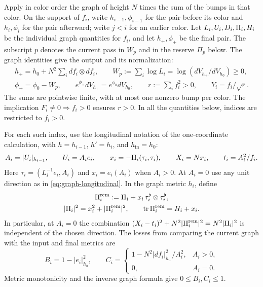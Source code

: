 Apply in color order the graph of height \(N\) times the sum of the
bumps in that color.  On the support of \(f_i\), write
\(h_{i-1},\phi_{i-1}\) for the pair before its color and
\(h_i,\phi_i\) for the pair afterward; write \(j<i\) for an earlier
color.  Let \(L_i,U_i,D_i,\mathrm{II}_i,H_i\) be the individual graph
quantities for \(f_i\), and let \(h_+,\phi_+\) be the final pair.
The subscript \(p\) denotes the current pass in \(W_p\) and in the
reserve \(\Pi_p\) below.
The graph identities give the output and its normalization:
\begin{equation}
 \begin{gathered}
 h_+=h_0+N^2\sum_i df_i\otimes df_i,\qquad
 W_p:=\sum_i\log L_i=\log(dV_{h_+}/dV_{h_0})\ge0,\\
 \phi_+=\phi_0-W_p,\qquad
 e^{\phi_+}dV_{h_+}=e^{\phi_0}dV_{h_0},\qquad
 r:=\sum_i f_i^2>0,\qquad Y_i=f_i/\sqrt r .
 \end{gathered}
 \label{eq:sweep-output}
\end{equation}
The sums are pointwise finite, with at most one nonzero bump per
color.  The implication \(F_i\ne0\Rightarrow f_i>0\) ensures
\(r>0\).  In all the quantities below, indices are restricted to
\(f_i>0\).

For each such index, use the longitudinal notation of the
one-coordinate calculation, with \(h=h_{i-1}\),
\(h'=h_i\), and \(h_{\mathrm{in}}=h_0\):
\[
 A_i=|U_i|_{h_{i-1}},\qquad U_i=A_i e_i,\qquad
 x_i=-\mathrm{II}_i(\tau_i,\tau_i),\qquad X_i=Nx_i,\qquad
 t_i=A_i^2/f_i.
\]
Here \(\tau_i=(L_i^{-1}e_i,A_i)\) and \(x_i=e_i(A_i)\) when
\(A_i>0\).  At \(A_i=0\) use any unit direction as in
\eqref{eq:graph-longitudinal}.  In the graph metric \(h_i\), define
\begin{equation}
 \begin{gathered}
 \mathrm{II}_i^{\mathrm{rem}}
      :=\mathrm{II}_i+x_i\,\tau_i^\flat\otimes\tau_i^\flat,\\
 |\mathrm{II}_i|^2=x_i^2+|\mathrm{II}_i^{\mathrm{rem}}|^2,\qquad
 \operatorname{tr}\mathrm{II}_i^{\mathrm{rem}}=H_i+x_i .
 \end{gathered}
 \label{eq:sweep-longitudinal}
\end{equation}
In particular, at \(A_i=0\) the combination
\((X_i-t_i)^2+N^2|\mathrm{II}_i^{\mathrm{rem}}|^2=N^2|\mathrm{II}_i|^2\)
is independent of the chosen direction.  The losses from comparing
the current graph with the input and final metrics are
\[
 B_i=1-|e_i|_{h_0}^2,\qquad
 C_i=
 \begin{cases}
 1-N^2|df_i|_{h_+}^2/A_i^2,&A_i>0,\\
 0,&A_i=0.
 \end{cases}
\]
Metric monotonicity and the inverse graph formula give
\(0\le B_i,C_i\le1\).


